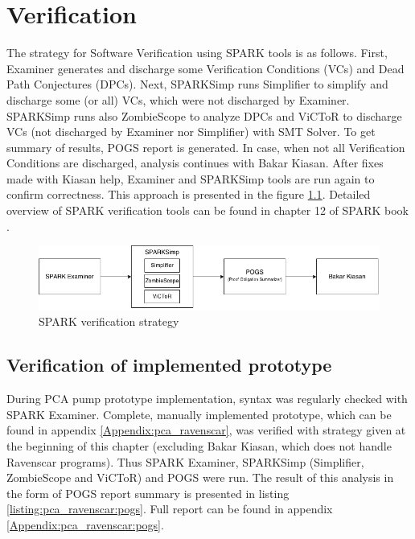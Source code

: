 
\cleardoublepage

\chapter{Verification}
\label{verification}


The strategy for Software Verification using SPARK tools is as follows. First, Examiner generates and discharge some Verification Conditions (VCs) and Dead Path Conjectures (DPCs). Next, SPARKSimp runs Simplifier to simplify and discharge some (or all) VCs, which were not discharged by Examiner. SPARKSimp runs also ZombieScope to analyze DPCs and ViCToR to discharge VCs (not discharged by Examiner nor Simplifier) with SMT Solver. To get summary of results, POGS report is generated. In case, when not all Verification Conditions are discharged, analysis continues with Bakar Kiasan. After fixes made with Kiasan help, Examiner and SPARKSimp tools are run again to confirm correctness. This approach is presented in the figure \ref{figure:sparkverificationstrategy}. Detailed overview of SPARK verification tools can be found in chapter 12 of SPARK book \cite{Barnes:Book}.

\begin{figure}[ht]%
    \begin{center}
        \includegraphics[width=1.0\textwidth]{figures/spark-verification.png}
        \caption{SPARK verification strategy}
    \end{center}
    \label{figure:sparkverificationstrategy}
\end{figure}

\section{Verification of implemented prototype}
\label{verification:prototype}

During PCA pump prototype implementation, syntax was regularly checked with SPARK Examiner. Complete, manually implemented prototype, which can be found in appendix \ref{Appendix:pca_ravenscar}, was verified with strategy given at the beginning of this chapter (excluding Bakar Kiasan, which does not handle Ravenscar programs). Thus SPARK Examiner, SPARKSimp (Simplifier, ZombieScope and ViCToR) and POGS were run. The result of this analysis in the form of POGS report summary is presented in listing \ref{listing:pca_ravenscar:pogs}. Full report can be found in appendix \ref{Appendix:pca_ravenscar:pogs}.

